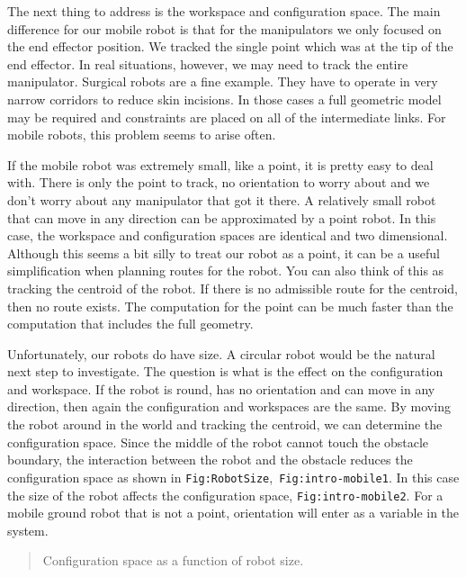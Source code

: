 The next thing to address is the workspace and configuration space. The
main difference for our mobile robot is that for the manipulators we
only focused on the end effector position. We tracked the single point
which was at the tip of the end effector. In real situations, however,
we may need to track the entire manipulator. Surgical robots are a fine
example. They have to operate in very narrow corridors to reduce skin
incisions. In those cases a full geometric model may be required and
constraints are placed on all of the intermediate links. For mobile
robots, this problem seems to arise often.

If the mobile robot was extremely small, like a point, it is pretty easy
to deal with. There is only the point to track, no orientation to worry
about and we don't worry about any manipulator that got it there. A
relatively small robot that can move in any direction can be
approximated by a point robot. In this case, the workspace and
configuration spaces are identical and two dimensional. Although this
seems a bit silly to treat our robot as a point, it can be a useful
simplification when planning routes for the robot. You can also think of
this as tracking the centroid of the robot. If there is no admissible
route for the centroid, then no route exists. The computation for the
point can be much faster than the computation that includes the full
geometry.

Unfortunately, our robots do have size. A circular robot would be the
natural next step to investigate. The question is what is the effect on
the configuration and workspace. If the robot is round, has no
orientation and can move in any direction, then again the configuration
and workspaces are the same. By moving the robot around in the world and
tracking the centroid, we can determine the configuration space. Since
the middle of the robot cannot touch the obstacle boundary, the
interaction between the robot and the obstacle reduces the configuration
space as shown in \texttt{Fig:RobotSize},~\texttt{Fig:intro-mobile1}. In
this case the size of the robot affects the configuration space,
\texttt{Fig:intro-mobile2}. For a mobile ground robot that is not a
point, orientation will enter as a variable in the system.

\begin{quote}
Configuration space as a function of robot size.
\end{quote}

